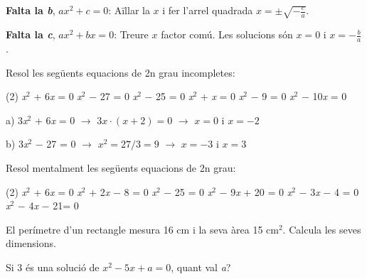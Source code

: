 \begin{theorybox}

 \textbf{Falta la \textit{b}},  $ax^2+c=0$:  Aïllar la $x$ i fer l'arrel quadrada $x=\pm \sqrt{-\frac{c}{a}}$.
 
 
  \textbf{Falta la \textit{c}},  $ax^2+bx=0$:  Treure $x$ factor comú. Les solucions són $x=0$ i $x=-\frac{b}{a}$  .
\end{theorybox}
 

 
\begin{mylist}

\exer[1]  Resol les següents equacions de 2n grau incompletes:

\begin{tasks}(2)
	\textit{x}${}^{2}$ + 6\textit{x} = 0    
	\textit{x}${}^{2}$ $-$ 27 = 0   
	\task  \textit{x}${}^{2}$ $-$ 25 = 0   
	\textit{x}${}^{2}$ + \textit{x} = 0    
	\textit{x}${}^{2}$ $-$ 9 = 0    
	\textit{x}${}^{2}$ $-$ 10\textit{x} = 0
\end{tasks}
\answers[cols=2]{[$x=0$ i $x=-2$, $x=\pm 3$, $x=\pm 5$, $x=0$ i $x=-1/2$, $x=-3/2$, $x=0$ i $x=2$]}

\end{mylist}

\begin{example}
	
	a) 3\textit{x}${}^{2}$ + 6\textit{x} = 0 \quad\quad   $\rightarrow$ \quad\quad $3x \cdot ( x+2)=0$ $\rightarrow$ \quad\quad $x=0$ i $x=-2$
	
	b) 3\textit{x}${}^{2}$ $-$ 27 = 0   \quad\quad   $\rightarrow$ \quad\quad $x^2 = 27/3 = 9$ $\rightarrow$ \quad\quad $x=-3$ i $x=3$
	
\end{example}


\begin{mylist}
	

\exer \mental  Resol mentalment les següents equacions de 2n grau:

\begin{tasks}(2)
	\task  \textit{x}${}^{2}$ + 6\textit{x} = 0    
	\task  \textit{x}${}^{2}$ + 2\textit{x} $-$ 8 = 0   
	\task  \textit{x}${}^{2}$ $-$ 25 = 0 
	\task  \textit{x}${}^{2}$ $-$ 9\textit{x} + 20 = 0   
	\task  \textit{x}${}^{2}$ $-$ 3\textit{x} $-$ 4 = 0   
	\task  \textit{x}${}^{2}$ $-$ 4\textit{x} $-$ 21= 0
\end{tasks}

\answers{[$x=0$ i $x=-6$, $x=-4$ i $x=2$, $x=-5$ i $x=5$, $x=4$ i $x=5$, $x=-1$ i $x=4$, $x=-3$ i $x=7$]}

\exer  El perímetre d'un rectangle mesura 16 cm i la seva àrea 15 cm${}^{2}$. Calcula les seves dimensions.


\exer  Si 3 és una solució de ${x}^{2}- 5x + a= 0$, quant val \textit{a}?


\end{mylist}

